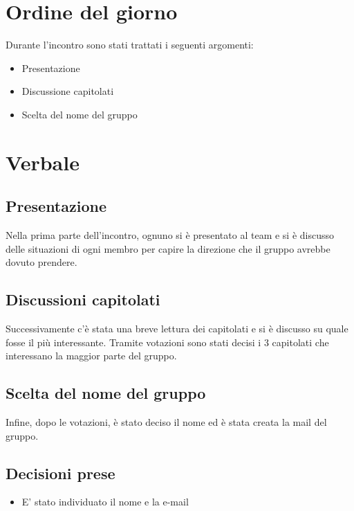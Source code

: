 \documentclass[italian, 12pt]{article}
\begin{document}
\section{Ordine del giorno}
Durante l'incontro sono stati trattati i seguenti argomenti: 
\begin{flushleft}
        \begin{itemize}
            \item Presentazione
            \item Discussione capitolati 
            \item Scelta del nome del gruppo
        \end{itemize}
\end{flushleft}
\newpage

\section{Verbale}
\subsection{Presentazione}
Nella prima parte dell'incontro, ognuno si è presentato al team e si è discusso delle situazioni di ogni membro per capire la direzione che il gruppo avrebbe dovuto prendere.

\subsection{Discussioni capitolati}
Successivamente c'è stata una breve lettura dei capitolati e si è discusso su quale fosse il più interessante. Tramite votazioni sono stati decisi i 3 capitolati che interessano la maggior parte del gruppo.

\subsection{Scelta del nome del gruppo}
Infine, dopo le votazioni, è stato deciso il nome ed è stata creata la mail del gruppo.

\subsection{Decisioni prese}
\begin{itemize}
    \item E' stato individuato il nome e la e-mail
\end{itemize}
\end{document}
